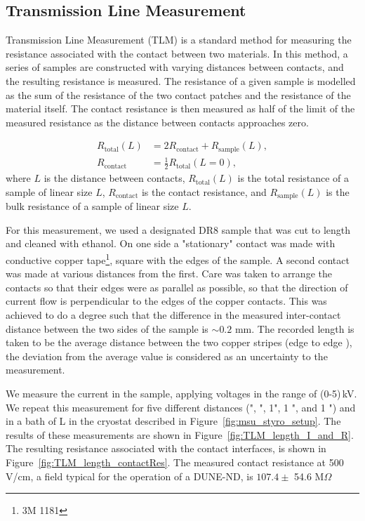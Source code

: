 \documentclass[a4paper,12pt]{article}
\newcommand{\DR}{DR8}
\begin{document}
\subsection{Transmission Line Measurement}
\label{sec:transLine}

Transmission Line Measurement (TLM) is a standard method for measuring the resistance associated with the contact between two materials.  In this method, a series of samples are constructed with varying distances between contacts, and the resulting resistance is measured.  The resistance of a given sample is modelled as the sum of the resistance of the two contact patches and the resistance of the material itself.  The contact resistance is then measured as half of the limit of the measured resistance as the distance between contacts approaches zero.

\begin{equation} \label{eq:TLM}
\begin{split} 
	R_{\mathrm{total}}(L) &= 2 R_{\mathrm{contact}} + R_{\mathrm{sample}}(L), \\
	R_{\mathrm{contact}}  &= \tfrac{1}{2} R_{\mathrm{total}}(L = 0),
\end{split}
\end{equation}
where $L$ is the distance between contacts, $R_{\mathrm{total}}(L)$ is the total resistance of a sample of linear size $L$, $R_\mathrm{contact}$ is the contact resistance, and $R_{\mathrm{sample}}(L)$ is the bulk resistance of a sample of linear size $L$.


For this measurement, we used a designated {\DR} sample that  was cut to length and cleaned with ethanol.  On one side a "stationary" contact was made with conductive copper tape\footnote{3M 1181}, square with the edges of the sample.  A second contact was made at various distances from the first.  Care was taken to arrange the contacts so that their edges were as parallel as possible, so that the direction of current flow is perpendicular to the edges of the copper contacts.  This was achieved to do a degree such that the difference in the measured inter-contact distance between the two sides of the sample is $\sim 0.2\,$\,mm.  The recorded length is taken to be the average distance between the two copper stripes (edge to edge ), the deviation from the average value is considered as an uncertainty to the measurement.

We measure the current in the sample, applying voltages in the range of (0-5)\,kV. We repeat this measurement for five different distances (", ", 1", 1 ", and 1 ") and in a bath of L in the cryostat described in Figure~\ref{fig:msu_styro_setup}. The results of these measurements are shown in Figure~\ref{fig:TLM_length_I_and_R}. The resulting resistance associated with the contact interfaces, is shown in Figure~\ref{fig:TLM_length_contactRes}.  The measured contact resistance at 500\,V/cm, a field typical for the operation of a DUNE-ND, is $107.4\pm$ 54.6 M$\Omega$
\end{document}
